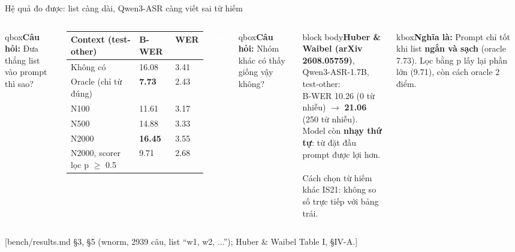 \documentclass[aspectratio=169,xcolor=table]{beamer}
\newcommand{\bad}[1]{\textcolor{RiskRed}{\textbf{#1}}}
\newcommand{\good}[1]{\textcolor{GoodGreen}{\textbf{#1}}}
\newcommand{\src}[1]{\par\vfill{\tiny\color{TextGray}[#1]}}
\newcommand{\ra}{$\rightarrow$}
\newcommand{\bsz}{\footnotesize}%
\newcommand{\nbox}[2][block body]{\begin{beamercolorbox}[sep=0.45em,rounded=true]{#1}\bsz #2\end{beamercolorbox}}
\newcommand{\cauhoi}[1]{\begin{beamercolorbox}[sep=0.30em,rounded=true]{qbox}\bsz\textbf{Câu hỏi:} #1\end{beamercolorbox}\vspace{0.08cm}}
\newcommand{\nghiala}[1]{\begin{beamercolorbox}[sep=0.32em,rounded=true]{kbox}\bsz\textbf{Nghĩa là:} #1\end{beamercolorbox}}
\newcommand{\tagbox}[2]{{\scriptsize\colorbox{#1}{\textcolor{white}{\textbf{#2}}}}}
\newcommand{\DO}{\tagbox{GoodGreen}{đo}}
\newcommand{\PA}{\tagbox{Primary}{paper}}
\begin{document}
\begin{frame}{Hệ quả đo được: list càng dài, Qwen3-ASR càng viết sai từ hiếm}
\begin{columns}[T]
\cauhoi{Đưa thẳng list vào prompt thì sao?}
\renewcommand{\arraystretch}{1.0}\footnotesize
\begin{tabular}{L{3.3cm}C{1.3cm}C{1.3cm}}
\toprule
Context (test-other) & B-WER & WER \\
\midrule
Không có & 16.08 & 3.41 \\
Oracle (chỉ từ đúng) & \good{7.73} & 2.43 \\
N100 & 11.61 & 3.17 \\
N500 & 14.88 & 3.33 \\
N2000 & \bad{16.45} & 3.55 \\
\midrule
N2000, scorer lọc p $\geq$ 0.5 & 9.71 & 2.68 \\
\bottomrule
\end{tabular}
\DO
{}
\cauhoi{Nhóm khác có thấy giống vậy không?}
\nbox{\textbf{Huber \& Waibel (arXiv 2608.05759)}, Qwen3-ASR-1.7B, test-other:\\[2pt]
B-WER 10.26 (0 từ nhiễu) \ra{} \bad{21.06} (250 từ nhiễu).\\[2pt]
Model còn \textbf{nhạy thứ tự}: từ đặt đầu prompt được lợi hơn. \PA\\[2pt]
{\scriptsize\color{TextGray}Cách chọn từ hiếm khác IS21: không so số trực tiếp với bảng trái.}}
\vspace{0.08cm}
\nghiala{Prompt chỉ tốt khi list \textbf{ngắn và sạch} (oracle 7.73). Lọc bằng p lấy lại phần lớn (9.71), còn cách oracle 2 điểm.}
\end{columns}
\src{bench/results.md §3, §5 (wnorm, 2939 câu, list ``w1, w2, ...''); Huber \& Waibel Table I, §IV-A.}
\end{frame}

\end{document}
